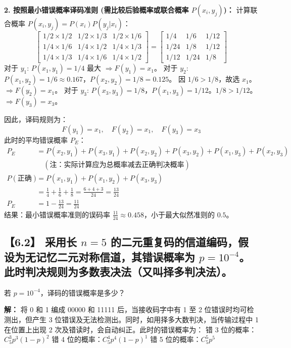 \documentclass[11pt, a4paper]{article}
\begin{document}
\textbf{2. 按照最小错误概率译码准则 (需比较后验概率或联合概率 $P(x_i, y_j)$)：}
计算联合概率 $P(x_i, y_j) = P(x_i)P(y_j|x_i)$：
\[
\begin{bmatrix}
1/2 \times 1/2 & 1/2 \times 1/3 & 1/2 \times 1/6 \\
1/4 \times 1/6 & 1/4 \times 1/2 & 1/4 \times 1/3 \\
1/4 \times 1/3 & 1/4 \times 1/6 & 1/4 \times 1/2
\end{bmatrix}
= \begin{bmatrix}
1/4 & 1/6 & 1/12 \\
1/24 & 1/8 & 1/12 \\
1/12 & 1/24 & 1/8
\end{bmatrix}
\]
对于 $y_1$: $P(x_1, y_1)=1/4$ 最大 $\Rightarrow F(y_1)=x_1$。
对于 $y_2$: $P(x_1, y_2)=1/6 \approx 0.167$，$P(x_2, y_2)=1/8=0.125$。
因 $1/6 > 1/8$，故选 $x_1$。$\Rightarrow F(y_2)=x_1$。
对于 $y_3$: $P(x_3, y_3)=1/8$，$P(x_1, y_3)=1/12$。$1/8 > 1/12$。$\Rightarrow F(y_3)=x_3$。

因此，译码规则为：
\[ F(y_1)=x_1, \quad F(y_2)=x_1, \quad F(y_3)=x_3 \]
此时的平均错误概率 $P_E$：
\[
\begin{aligned}
P_E &= P(x_2, y_1) + P(x_3, y_1) + P(x_2, y_2) + P(x_3, y_2) + P(x_1, y_3) + P(x_2, y_3) \\
& \quad (\text{注：实际计算应为总概率减去正确判决概率}) \\
P(\text{正确}) &= P(x_1, y_1) + P(x_1, y_2) + P(x_3, y_3) \\
&= \frac{1}{4} + \frac{1}{6} + \frac{1}{8} = \frac{6+4+3}{24} = \frac{13}{24} \\
P_E &= 1 - \frac{13}{24} = \frac{11}{24}
\end{aligned}
\]
结果：最小错误概率准则的误码率 $\frac{11}{24} \approx 0.458$，小于最大似然准则的 $0.5$。

\subsection*{【6.2】 采用长 $n=5$ 的二元重复码的信道编码，假设为无记忆二元对称信道，其错误概率为 $p=10^{-4}$。此时判决规则为多数表决法（又叫择多判决法）。}
若 $p=10^{-4}$，译码的错误概率是多少？

\textbf{解：}
将 0 和 1 编成 00000 和 11111 后，当接收码字中有 1 至 2 位错误时均可检测出，但产生 3 位错误及无法检测出。同时，如用择多大数判决，当传输过程中 1 在位置上出现 2 次及错读时，会自动纠正。此时的错误概率为：
错 3 位的概率：$C_5^3 p^3 (1-p)^2$
错 4 位的概率：$C_5^4 p^4 (1-p)^1$
错 5 位的概率：$C_5^5 p^5$
\end{document}
